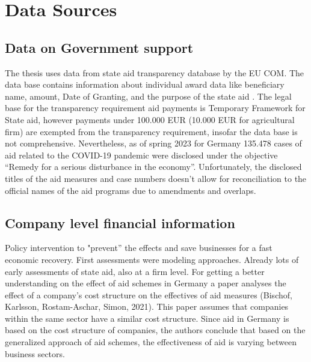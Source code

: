 
\chapter{Data Sources} %

\label{Chapter3} %


\section{Data on Government support}

The thesis uses data from state aid transparency database by the EU COM. The data base contains information about individual award data like beneficiary name, amount, Date of Granting, and the purpose of the state aid \parencite{eu_com_state_2023}. The legal base for the transparency requirement aid payments is Temporary Framework for State aid, however payments under 100.000 EUR (10.000 EUR for agricultural firm) are exempted from the transparency requirement, insofar the data base is not comprehensive. Nevertheless, as of spring 2023 for Germany 135.478 cases of aid related to the COVID-19 pandemic were disclosed under the objective “Remedy for a serious disturbance in the economy”. Unfortunately, the disclosed titles of the aid measures and case numbers doesn’t allow for reconciliation to the official names of the aid programs due to amendments and overlaps.






\section{Company level financial information}

Policy intervention to "prevent” the effects and save businesses for a fast economic recovery.
First assessments were modeling approaches.
Already lots of early assessments of state aid, also at a firm level.
For getting a better understanding on the effect of aid schemes in Germany a paper analyses the effect of a company’s cost structure on the effectives of aid measures (Bischof, Karlsson, Rostam-Aschar, Simon, 2021). 
This paper assumes that companies within the same sector have a similar cost structure. 
Since aid in Germany is based on the cost structure of companies, the authors conclude that based on the generalized approach of aid schemes, the effectiveness of aid is varying between business sectors.